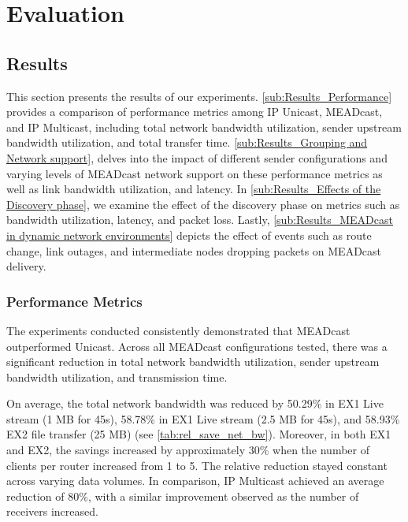 \chapter{Evaluation} %
\label{chap:Evaluation}

\section{Results} %
\label{sec:Results}
This section presents the results of our experiments.
\autoref{sub:Results_Performance} provides a comparison of performance metrics among IP
    Unicast, MEADcast, and IP Multicast, including total network bandwidth
    utilization, sender upstream bandwidth utilization, and total transfer
    time.
\autoref{sub:Results_Grouping and Network support}, delves into the impact of different
    sender configurations and varying levels of MEADcast network support on
    these performance metrics as well as link bandwidth utilization, and
    latency.
In \autoref{sub:Results_Effects of the Discovery phase}, we examine the effect of the
    discovery phase on metrics such as bandwidth utilization, latency, and
    packet loss.
Lastly, \autoref{sub:Results_MEADcast in dynamic network environments} depicts the
    effect of events such as route change, link outages, and intermediate nodes
    dropping packets on MEADcast delivery.
\subsection{Performance Metrics} %
\label{sub:Results_Performance}
The experiments conducted consistently demonstrated that MEADcast outperformed
    Unicast.
Across all MEADcast configurations tested, there was a significant reduction in
    total network bandwidth utilization, sender upstream bandwidth utilization,
    and transmission time.

On average, the total network bandwidth was reduced by 50.29\% in EX1 Live
    stream (1 MB for 45s), 58.78\% in EX1 Live stream (2.5 MB for 45s), and
    58.93\% EX2 file transfer (25 MB) (see \autoref{tab:rel_save_net_bw}).
Moreover, in both EX1 and EX2, the savings increased by approximately 30\%
    when the number of clients per router increased from 1 to 5.
The relative reduction stayed constant across varying data volumes.
In comparison, IP Multicast achieved an average reduction of 80\%, with a
    similar improvement observed as the number of receivers increased.

